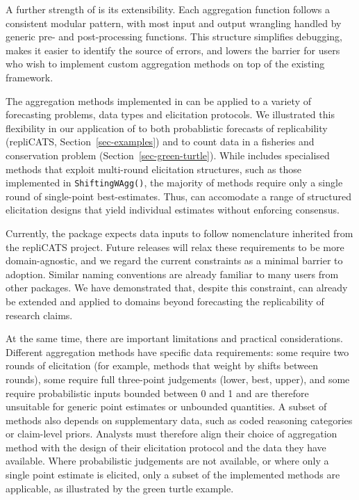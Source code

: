 \documentclass[
  11pt,
  a4paper,
]{article}
\begin{document}
A further strength of  is its extensibility. Each
aggregation function follows a consistent modular pattern, with most
input and output wrangling handled by generic pre- and post-processing
functions. This structure simplifies debugging, makes it easier to
identify the source of errors, and lowers the barrier for users who wish
to implement custom aggregation methods on top of the existing
framework.

The aggregation methods implemented in  can be applied to
a variety of forecasting problems, data types and elicitation protocols.
We illustrated this flexibility in our application of  to
both probablistic forecasts of replicability (repliCATS,
Section~\ref{sec-examples}) and to count data in a fisheries and
conservation problem (Section~\ref{sec-green-turtle}). While
 includes specialised methods that exploit multi-round
elicitation structures, such as those implemented in
\texttt{ShiftingWAgg()}, the majority of methods require only a single
round of single-point best-estimates. Thus,  can
accomodate a range of structured elicitation designs that yield
individual estimates without enforcing consensus.

Currently, the package expects data inputs to follow nomenclature
inherited from the repliCATS project. Future releases will relax these
requirements to be more domain-agnostic, and we regard the current
constraints as a minimal barrier to adoption. Similar naming conventions
are already familiar to many users from other  packages. We
have demonstrated that, despite this constraint,  can
already be extended and applied to domains beyond forecasting the
replicability of research claims.

At the same time, there are important limitations and practical
considerations. Different aggregation methods have specific data
requirements: some require two rounds of elicitation (for example,
methods that weight by shifts between rounds), some require full
three-point judgements (lower, best, upper), and some require
probabilistic inputs bounded between 0 and 1 and are therefore
unsuitable for generic point estimates or unbounded quantities. A subset
of methods also depends on supplementary data, such as coded reasoning
categories or claim-level priors. Analysts must therefore align their
choice of aggregation method with the design of their elicitation
protocol and the data they have available. Where probabilistic
judgements are not available, or where only a single point estimate is
elicited, only a subset of the implemented methods are applicable, as
illustrated by the green turtle example.
\end{document}
